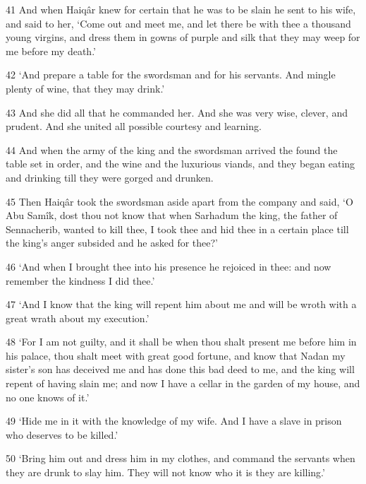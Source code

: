 \par 41 And when Haiqâr knew for certain that he was to be slain he sent to his wife, and said to her, ‘Come out and meet me, and let there be with thee a thousand young virgins, and dress them in gowns of purple and silk that they may weep for me before my death.’

\par 42 ‘And prepare a table for the swordsman and for his servants. And mingle plenty of wine, that they may drink.’

\par 43 And she did all that he commanded her. And she was very wise, clever, and prudent. And she united all possible courtesy and learning.

\par 44 And when the army of the king and the swordsman arrived the found the table set in order, and the wine and the luxurious viands, and they began eating and drinking till they were gorged and drunken.

\par 45 Then Haiqâr took the swordsman aside apart from the company and said, ‘O Abu Samîk, dost thou not know that when Sarhadum the king, the father of Sennacherib, wanted to kill thee, I took thee and hid thee in a certain place till the king's anger subsided and he asked for thee?’

\par 46 ‘And when I brought thee into his presence he rejoiced in thee: and now remember the kindness I did thee.’

\par 47 ‘And I know that the king will repent him about me and will be wroth with a great wrath about my execution.’

\par 48 ‘For I am not guilty, and it shall be when thou shalt present me before him in his palace, thou shalt meet with great good fortune, and know that Nadan my sister's son has deceived me and has done this bad deed to me, and the king will repent of having slain me; and now I have a cellar in the garden of my house, and no one knows of it.’

\par 49 ‘Hide me in it with the knowledge of my wife. And I have a slave in prison who deserves to be killed.’

\par 50 ‘Bring him out and dress him in my clothes, and command the servants when they are drunk to slay him. They will not know who it is they are killing.’

